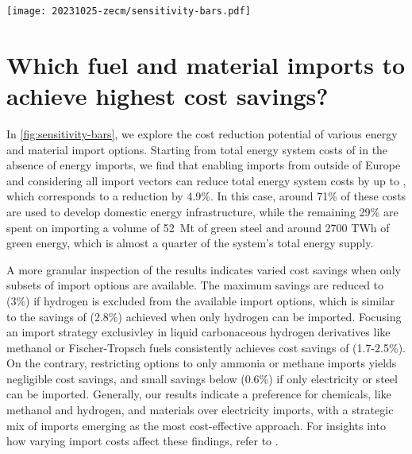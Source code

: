 
\begin{figure*}
    \texttt{[image: 20231025-zecm/sensitivity-bars.pdf]}
    \caption{\textbf{Potential for cost reductions with reduced sets of import options.}
        Subsets of available import options are sorted by ascending cost reduction potential. 
        Top panel shows profile of total cost savings.
        Bottom panel shows composition and extent of imports in relation to total energy system costs.
        Percentage numbers in bar plot indicate the share of total system costs spent on domestic energy infrastructure.
        Alternative versions of this figure with higher and lower import cost assumptions are included in the supplementary material.
    }
    \label{fig:sensitivity-bars}
\end{figure*}

\section*{Which fuel and material imports to achieve highest cost savings?}

In \cref{fig:sensitivity-bars}, we explore the cost reduction potential of
various energy and material import options. Starting from total energy system
costs of  in the absence of energy imports, we find that enabling
imports from outside of Europe and considering all import vectors can reduce
total energy system costs by up to , which corresponds to a reduction
by 4.9\%. In this case, around 71\% of these costs are used to develop domestic
energy infrastructure, while the remaining 29\% are spent on importing a volume
of 52~Mt of green steel and around 2700 TWh of green energy, which is almost a
quarter of the system's total energy supply.

A more granular inspection of the results indicates varied cost savings when
only subsets of import options are available. The maximum savings are reduced to
 (3\%) if hydrogen is excluded from the available import options,
which is similar to the savings of  (2.8\%) achieved when only
hydrogen can be imported. Focusing an import strategy exclusivley in liquid
carbonaceous hydrogen derivatives like methanol or Fischer-Tropsch fuels
consistently achieves cost savings of  (1.7-2.5\%). On the
contrary, restricting options to only ammonia or methane imports yields
negligible cost savings, and small savings below  (0.6\%) if only
electricity or steel can be imported.
Generally, our results indicate a preference for chemicals, like methanol and
hydrogen, and materials over electricity imports, with a strategic mix of
imports emerging as the most cost-effective approach.
For insights into how varying import costs affect these findings, refer to
. 

